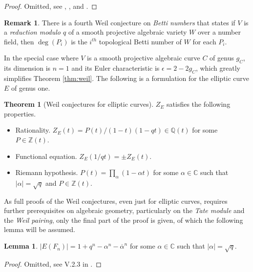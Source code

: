 \documentclass{article}
\newcommand{\Z}{\mathbb{Z}}
\newcommand{\Q}{\mathbb{Q}}
\newcommand{\C}{\mathbb{C}}
\newcommand{\rb}[1]{\left( #1 \right)}
\newcommand{\abs}[1]{\left\lvert #1 \right\rvert}
\theoremstyle{definition}\newtheorem*{definition}{Definition}
\theoremstyle{definition}\newtheorem*{example}{Example}
\theoremstyle{definition}\newtheorem*{remark}{Remark}
\newtheorem{lemma}[proposition]{Lemma}
\newtheorem{theorem}[proposition]{Theorem}
\begin{document}
\begin{proof}
Omitted, see \cite{weil1}, \cite{weil2}, and \cite{weil3}.
\end{proof}

\pagebreak

\begin{remark}
There is a fourth Weil conjecture on \emph{Betti numbers} that states if $ V $ is a \emph{reduction modulo $ q $} of a smooth projective algebraic variety $ W $ over a number field, then $ \deg\rb{P_i} $ is the $ i^{th} $ topological Betti number of $ W $ for each $ P_i $.
\end{remark}

In the special case where $ V $ is a smooth projective algebraic curve $ C $ of genus $ g_C $, its dimension is $ n = 1 $ and its Euler characteristic is $ \epsilon = 2 - 2g_C $, which greatly simplifies Theorem \ref{thm:weil}. The following is a formulation for the elliptic curve $ E $ of genus one.

\begin{theorem}[Weil conjectures for elliptic curves]
\label{thm:weilcurve}
$ Z_E $ satisfies the following properties.
\begin{itemize}
\item Rationality. $ Z_E\rb{t} = P\rb{t} / \rb{1 - t}\rb{1 - qt} \in \Q\rb{t} $ for some $ P \in \Z\rb{t} $.
\item Functional equation. $ Z_E\rb{1 / qt} = \pm Z_E\rb{t} $.
\item Riemann hypothesis. $ P\rb{t} = \prod_\alpha \rb{1 - \alpha t} $ for some $ \alpha \in \C $ such that $ \abs{\alpha} = \sqrt{q} $ and $ P \in \Z\rb{t} $.
\end{itemize}
\end{theorem}

As full proofs of the Weil conjectures, even just for elliptic curves, requires further prerequisites on algebraic geometry, particularly on the \emph{Tate module} and the \emph{Weil pairing}, only the final part of the proof is given, of which the following lemma will be assumed.

\begin{lemma}
$ \abs{E\rb{F_n}} = 1 + q^n - \alpha^n - \overline{\alpha}^n $ for some $ \alpha \in \C $ such that $ \abs{\alpha} = \sqrt{q} $.
\end{lemma}

\begin{proof}
Omitted, see V.2.3 in \cite{gtm}.
\end{proof}
\end{document}
